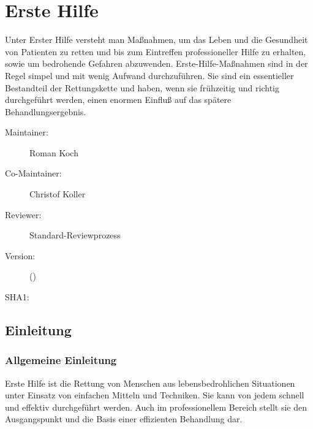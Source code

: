 \def\ChapterCode{EHI}
\chapter
[\CO{[\ChapterCode]} Erste Hilfe]
{Erste Hilfe}
\label{chp:EHI}


\ChapterIntro
{%
Unter Erster Hilfe versteht man Maßnahmen, um das Leben und
die Gesundheit von Patienten zu retten und bis zum
Eintreffen professioneller Hilfe zu erhalten, sowie um
bedrohende Gefahren abzuwenden. Erste-Hilfe-Maßnahmen sind
in der Regel simpel und mit wenig Aufwand durchzuführen. Sie
sind ein essentieller Bestandteil der Rettungskette und
haben, wenn sie frühzeitig und richtig durchgeführt werden,
einen enormen Einfluß auf das spätere Behandlungsergebnis. 
}
{%
\begin{description}
  \item[Maintainer:] Roman Koch
  \item[Co-Maintainer:] Christof Koller
  \item[Reviewer:] Standard-Reviewprozess
  \item[Version:] {\DocVersion} ({\DocVersionInfo})
  \item[SHA1:] {\DocGitCommit}
\end{description}

{\TxTeilkapitelAASS}
}

\section{Einleitung}


\subsection{Allgemeine Einleitung}



Erste Hilfe ist die Rettung von Menschen aus
lebensbedrohlichen Situationen unter Einsatz von einfachen
Mitteln und Techniken. Sie kann von jedem schnell und
effektiv durchgeführt werden. Auch im professionellem
Bereich stellt sie den Ausgangspunkt und die Basis einer
effizienten Behandlung dar.


